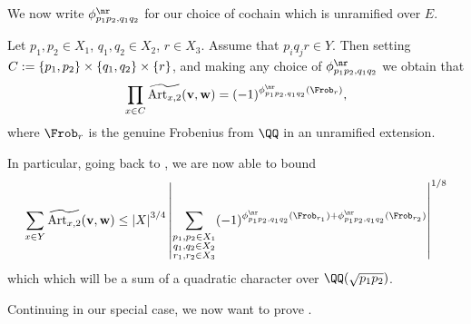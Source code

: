 \documentclass{lecturenotes}
\newcommand{\Art}{\operatorname{Art}}
\newcommand{\bv}{\mathbf{v}}
\newcommand{\bw}{\mathbf{w}}
\numberwithin{equation}{section}
\begin{document}
We now write $\phi_{p_1p_2,q_1q_2}^\nr$ for our choice of cochain which is unramified over $E$.
\begin{theorem}\label{thm:cubesum}
    Let $p_1,p_2\in X_1$, $q_1,q_2\in X_2$, $r\in X_3$.  Assume that $p_iq_jr\in Y$.  Then setting $C:=\left\{{p_1,p_2}\right\}\times \left\{{q_1,q_2}\right\}\times \left\{{r}\right\}$, and making any choice of $\phi_{p_1p_2,q_1q_2}^\nr$ we obtain that
    \[\prod_{x\in C}\widetilde{\Art_{x,2}}(\bv,\bw)=(-1)^{\phi_{p_1p_2,q_1q_2}^\nr(\Frob_r)},\]
    where $\Frob_r$ is the genuine Frobenius from $\QQ$ in an unramified extension.
\end{theorem}

In particular, going back to , we are now able to bound
\[\sum_{x\in Y}\widetilde{\Art_{x,2}}(\bv,\bw)\leq \abs{X}^{3/4}\abs{\sum_{\substack{p_1,p_2\in X_1\\q_1,q_2\in X_2\\r_1,r_2\in X_3}}(-1)^{\phi_{p_1p_2,q_1q_2}^\nr(\Frob_{r_1})+\phi_{p_1p_2,q_1q_2}^\nr(\Frob_{r_2})}}^{1/8}\]
which which will be a sum of a quadratic character over $\QQ(\sqrt{p_1p_2})$.

Continuing in our special case, we now want to prove .
\end{document}
